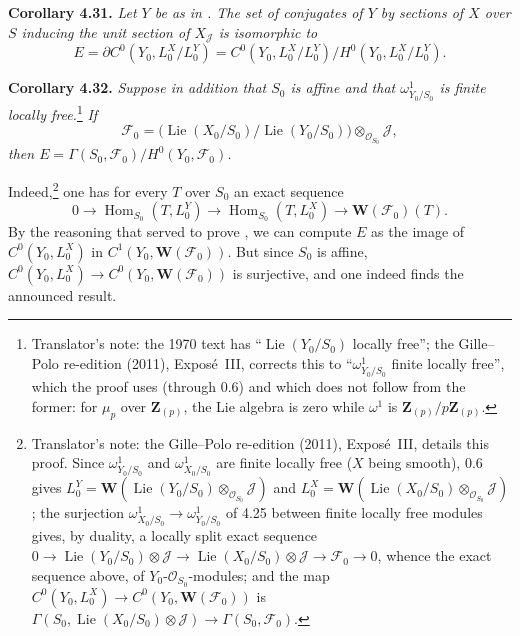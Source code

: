 

\medskip
\noindent{}\textbf{Corollary 4.31.}
\textit{Let \(Y\) be as in . The set of conjugates of \(Y\) by
sections of \(X\) over \(S\) inducing the unit section of
\(X_{\mathscr J}\) is isomorphic to}
\[
 E=\partial C^0(Y_0,L_0^X/L_0^Y)
 =C^0(Y_0,L_0^X/L_0^Y)\big/H^0(Y_0,L_0^X/L_0^Y).
\]

\medskip
\noindent{}\textbf{Corollary 4.32.}
\textit{Suppose in addition that \(S_0\) is affine and that
\(\omega^1_{Y_0/S_0}\) is finite locally free.}\footnote{Translator's note: the 1970
text has ``\(\operatorname{Lie}(Y_0/S_0)\) locally free''; the Gille--Polo
re-edition (2011), Exposé~III, corrects this to ``\(\omega^1_{Y_0/S_0}\) finite
locally free'', which the proof uses (through 0.6) and which does not follow
from the former: for \(\mu_p\) over \(\mathbf Z_{(p)}\), the Lie algebra is zero
while \(\omega^1\) is \(\mathbf Z_{(p)}/p\mathbf Z_{(p)}\).} \textit{If}
\[
 \mathscr F_0=
 \bigl(\operatorname{Lie}(X_0/S_0)/
       \operatorname{Lie}(Y_0/S_0)\bigr)
 \otimes_{\mathscr O_{S_0}}\mathscr J,
\]
\textit{then
\(E=\Gamma(S_0,\mathscr F_0)/H^0(Y_0,\mathscr F_0)\).}

Indeed,\footnote{Translator's note: the Gille--Polo re-edition (2011), Exposé~III, details this proof. Since
\(\omega^1_{Y_0/S_0}\) and \(\omega^1_{X_0/S_0}\) are finite locally free (\(X\)
being smooth), 0.6 gives \(L_0^Y=\mathbf W(\operatorname{Lie}(Y_0/S_0)
\otimes_{\mathscr O_{S_0}}\mathscr J)\) and \(L_0^X=\mathbf W(\operatorname{Lie}
(X_0/S_0)\otimes_{\mathscr O_{S_0}}\mathscr J)\); the surjection
\(\omega^1_{X_0/S_0}\to\omega^1_{Y_0/S_0}\) of 4.25 between finite locally free
modules gives, by duality, a locally split exact sequence \(0\to\operatorname{Lie}
(Y_0/S_0)\otimes\mathscr J\to\operatorname{Lie}(X_0/S_0)\otimes\mathscr J\to
\mathscr F_0\to0\), whence the exact sequence above, of
\(Y_0\)-\(\mathscr O_{S_0}\)-modules; and the map \(C^0(Y_0,L_0^X)\to
C^0(Y_0,\mathbf W(\mathscr F_0))\) is \(\Gamma(S_0,\operatorname{Lie}(X_0/S_0)
\otimes\mathscr J)\to\Gamma(S_0,\mathscr F_0)\).} one has for every \(T\) over \(S_0\) an exact sequence
\[
 0\longrightarrow\operatorname{Hom}_{S_0}(T,L_0^Y)
 \longrightarrow\operatorname{Hom}_{S_0}(T,L_0^X)
 \longrightarrow\mathbf W(\mathscr F_0)(T).
\]
By the reasoning that served to prove , we can compute \(E\) as
the image of \(C^0(Y_0,L_0^X)\) in \(C^1(Y_0,\mathbf W(\mathscr F_0))\). But
since \(S_0\) is affine, \(C^0(Y_0,L_0^X)\to C^0(Y_0,\mathbf W(\mathscr F_0))\)
is surjective, and one indeed finds the announced result.

